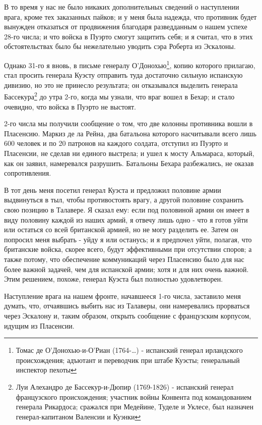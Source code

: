 \documentclass[
  oneside,
  12pt,
  titlepage]{book}
\begin{document}
В то время у нас не было никаких дополнительных сведений о наступлении врага, кроме тех заказанных пайков; и у меня была надежда, что противник будет вынужден отказаться от продвижения благодаря разведданным о нашем успехе 28-го числа; и что войска в Пуэрто смогут защитить себя; и я считал, что в этих обстоятельствах было бы нежелательно уводить сэра Роберта из Эскалоны.

Однако 31-го я вновь, в письме генералу О'Донохью\footnote{Томас де О'Донохью-и-О'Риан (1764-\ldots) - испанский генерал ирландского происхождения; адъютант и переводчик при штабе Куэсты; генеральный инспектор пехоты}, копию которого прилагаю, стал просить генерала Куэсту отправить туда достаточно сильную испанскую дивизию, но это не принесло результата; он отказывался выделить генерала Бассекура\footnote{Луи Алехандро де Бассекур-и-Дюпир (1769-1826) - испанский генерал французского происхождения; участник войны Конвента под командованием генерала Рикардоса; сражался при Медейине, Туделе и Уклесе, был назначен генерал-капитаном Валенсии и Куэнки} до утра 2-го, когда мы узнали, что враг вошел в Бехар; и стало очевидно, что войска в Пуэрто не выстоят.

2-го числа мы получили сообщение о том, что две колонны противника вошли в Пласенсию. Маркиз де ла Рейна, два батальона которого насчитывали всего лишь 600 человек и по 20 патронов на каждого солдата, отступил из Пуэрто и Пласенсии, не сделав ни единого выстрела; и ушел к мосту Альмараса, который, как он заявил, намеревался разрушить. Батальоны Бехара разбежались, не оказав сопротивления.

В тот день меня посетил генерал Куэста и предложил половине армии выдвинуться в тыл, чтобы противостоять врагу, а другой половине сохранить свою позицию в Талавере. Я сказал ему: если под половиной армии он имеет в виду половину каждой из наших армий, я отвечу лишь одно - что я готов уйти или остаться со всей британской армией, но не могу разделить ее. Затем он попросил меня выбрать - уйду я или останусь; и я предпочел уйти, полагая, что британские войска, скорее всего, будут эффективными при отсутствии споров; а также потому, что обеспечение коммуникаций через Пласенсию было для нас более важной задачей, чем для испанской армии; хотя и для них очень важной. Этим решением, похоже, генерал Куэста был полностью удовлетворен.

Наступление врага на нашем фронте, начавшееся 1-го числа, заставило меня думать, что, отчаявшись выбить нас из Талаверы, они намеревались прорваться через Эскалону и, таким образом, открыть сообщение с французским корпусом, идущим из Пласенсии.
\end{document}
